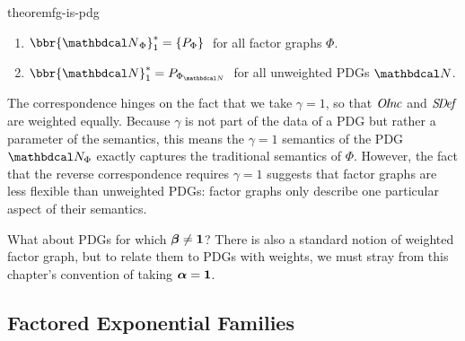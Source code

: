 \begin{linked}{theorem}{fg-is-pdg}
    \label{theorem:pdg-is-fg}
\begin{enumerate}[label={(\alph*)}]
    \item
$\bbr{\UPDGof{\Phi}}_{1}^* = \{ \Pr_\Phi \} \;$ for all factor graphs
$\Phi$.%
\item
$\bbr{\dg N}_{1}^* = \Pr_{\FGof{\dg N}}\;$ for all unweighted
	PDGs $\dg N$.  
\end{enumerate}
\end{linked}

The correspondence hinges on the fact that we take $\gamma=1$, so that $\mathit{O\mskip-2.5muI\mskip-3.5mun\mskip-1.7muc}$ and
$\mathit{S\mskip-3.5muD\mskip-2.5mue\mskip-1.5muf}$ are weighted equally.
Because $\gamma$ is not part of the data of a PDG but rather a parameter of the semantics, this means
    the $\gamma=1$ semantics of the PDG $\dg N_\Phi$ exactly captures
    the traditional semantics of $\Phi$.
%
%
However, the fact that the reverse correspondence requires
$\gamma=1$ suggests that factor graphs are less flexible than unweighted PDGs: factor graphs only describe one particular aspect of their semantics.

What about 
PDGs for which $\boldsymbol\beta \ne {\mathbf 1}$?
There is also a standard notion of weighted factor graph,
    but to relate them to PDGs with weights, 
    we must stray from this chapter's 
    convention of taking $\boldsymbol\alpha = {\mathbf 1}$. 


\subsection{Factored Exponential Families}\label{sec:expfam}

